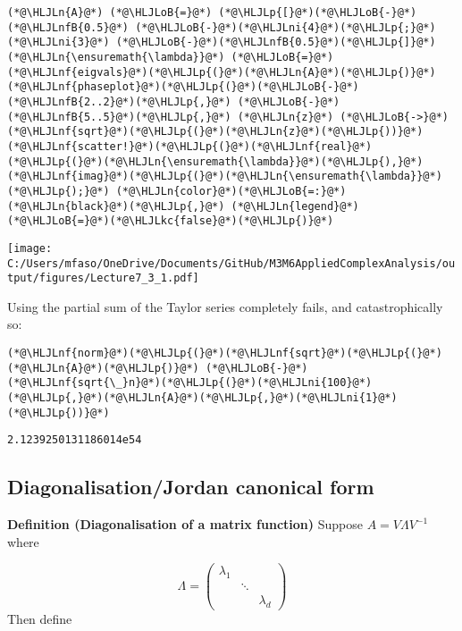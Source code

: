 \documentclass[12pt,a4paper]{article}
\newcommand{\HLJLkc}[1]{\textcolor[RGB]{59,151,46}{\textit{#1}}}
\newcommand{\HLJLn}[1]{#1}
\newcommand{\HLJLnf}[1]{\textcolor[RGB]{66,102,213}{#1}}
\newcommand{\HLJLnfB}[1]{\textcolor[RGB]{59,151,46}{#1}}
\newcommand{\HLJLni}[1]{\textcolor[RGB]{59,151,46}{#1}}
\newcommand{\HLJLoB}[1]{\textcolor[RGB]{102,102,102}{\textbf{#1}}}
\newcommand{\HLJLp}[1]{#1}
\begin{document}
\begin{lstlisting}
(*@\HLJLn{A}@*) (*@\HLJLoB{=}@*) (*@\HLJLp{[}@*)(*@\HLJLoB{-}@*)(*@\HLJLnfB{0.5}@*) (*@\HLJLoB{-}@*)(*@\HLJLni{4}@*)(*@\HLJLp{;}@*) (*@\HLJLni{3}@*) (*@\HLJLoB{-}@*)(*@\HLJLnfB{0.5}@*)(*@\HLJLp{]}@*)
(*@\HLJLn{\ensuremath{\lambda}}@*) (*@\HLJLoB{=}@*) (*@\HLJLnf{eigvals}@*)(*@\HLJLp{(}@*)(*@\HLJLn{A}@*)(*@\HLJLp{)}@*)
(*@\HLJLnf{phaseplot}@*)(*@\HLJLp{(}@*)(*@\HLJLoB{-}@*)(*@\HLJLnfB{2..2}@*)(*@\HLJLp{,}@*) (*@\HLJLoB{-}@*)(*@\HLJLnfB{5..5}@*)(*@\HLJLp{,}@*) (*@\HLJLn{z}@*) (*@\HLJLoB{->}@*) (*@\HLJLnf{sqrt}@*)(*@\HLJLp{(}@*)(*@\HLJLn{z}@*)(*@\HLJLp{))}@*)
(*@\HLJLnf{scatter!}@*)(*@\HLJLp{(}@*)(*@\HLJLnf{real}@*)(*@\HLJLp{(}@*)(*@\HLJLn{\ensuremath{\lambda}}@*)(*@\HLJLp{),}@*)(*@\HLJLnf{imag}@*)(*@\HLJLp{(}@*)(*@\HLJLn{\ensuremath{\lambda}}@*)(*@\HLJLp{);}@*) (*@\HLJLn{color}@*)(*@\HLJLoB{=:}@*)(*@\HLJLn{black}@*)(*@\HLJLp{,}@*) (*@\HLJLn{legend}@*)(*@\HLJLoB{=}@*)(*@\HLJLkc{false}@*)(*@\HLJLp{)}@*)
\end{lstlisting}

\texttt{[image: C:/Users/mfaso/OneDrive/Documents/GitHub/M3M6AppliedComplexAnalysis/output/figures/Lecture7\_3\_1.pdf]}

Using the partial sum of the Taylor series completely fails, and catastrophically so:


\begin{lstlisting}
(*@\HLJLnf{norm}@*)(*@\HLJLp{(}@*)(*@\HLJLnf{sqrt}@*)(*@\HLJLp{(}@*)(*@\HLJLn{A}@*)(*@\HLJLp{)}@*) (*@\HLJLoB{-}@*) (*@\HLJLnf{sqrt{\_}n}@*)(*@\HLJLp{(}@*)(*@\HLJLni{100}@*)(*@\HLJLp{,}@*)(*@\HLJLn{A}@*)(*@\HLJLp{,}@*)(*@\HLJLni{1}@*)(*@\HLJLp{))}@*)
\end{lstlisting}

\begin{lstlisting}
2.1239250131186014e54
\end{lstlisting}


\subsection{Diagonalisation/Jordan canonical form}
\textbf{Definition (Diagonalisation of a matrix function)} Suppose $A = V \Lambda V^{-1}$ where

\[
\Lambda = \begin{pmatrix} \lambda_1 \\ & \ddots \\ && \lambda_d \end{pmatrix}
\]
Then define
\end{document}
